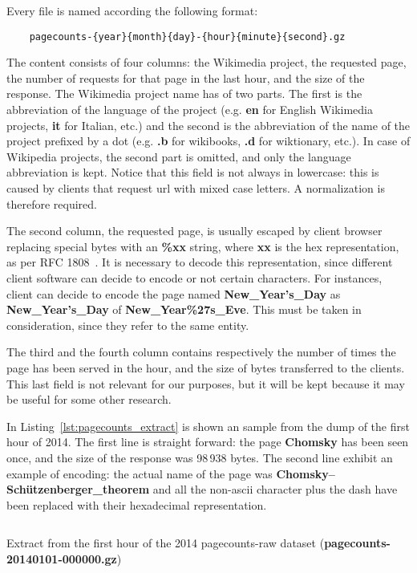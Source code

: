 Every file is named according the following format:
\begin{verbatim}
    pagecounts-{year}{month}{day}-{hour}{minute}{second}.gz
\end{verbatim}
The content consists of four columns: the Wikimedia project, the requested page, the number of requests for that page in the last hour, and the size of the response.
The Wikimedia project name has of two parts.
The first is the abbreviation of the language of the project (e.g. \textbf{en} for English Wikimedia projects, \textbf{it} for Italian, etc.) and the second is the abbreviation of the name of the project prefixed by a dot (e.g. \textbf{.b} for wikibooks, \textbf{.d} for wiktionary, etc.).
In case of Wikipedia projects, the second part is omitted, and only the language abbreviation is kept.
Notice that this field is not always in lowercase: this is caused by clients that request url with mixed case letters.
A normalization is therefore required.

The second column, the requested page, is usually escaped by client browser replacing special bytes with an \textbf{\%xx} string, where \textbf{xx} is the hex representation, as per RFC 1808~\cite{rfc1808}.
It is necessary to decode this representation, since different client software can decide to encode or not certain characters.
For instances, client can decide to encode the page named \textbf{New\_Year's\_Day} as \textbf{New\_Year's\_Day} of \textbf{New\_Year\%27s\_Eve}.
This must be taken in consideration, since they refer to the same entity.

The third and the fourth column contains respectively the number of times the page has been served in the hour, and the size of bytes transferred to the clients.
This last field is not relevant for our purposes, but it will be kept because it may be useful for some other research.

In Listing~\ref{lst:pagecounts_extract} is shown an sample from the dump of the first hour of 2014.
The first line is straight forward: the page \textbf{Chomsky} has been seen once, and the size of the response was 98\,938 bytes.
The second line exhibit an example of encoding: the actual name of the page was \textbf{Chomsky–Schützenberger\_theorem} and all the non-ascii character plus the dash have been replaced with their hexadecimal representation.

\begin{listing}[]
    \inputminted[breaklines=true]{xml}{assets/pagecounts_extract_first_hour.txt}
    \caption{Extract from the first hour of the 2014 pagecounts-raw dataset (\textbf{pagecounts-20140101-000000.gz})}
    \label{lst:pagecounts_extract}
\end{listing}

